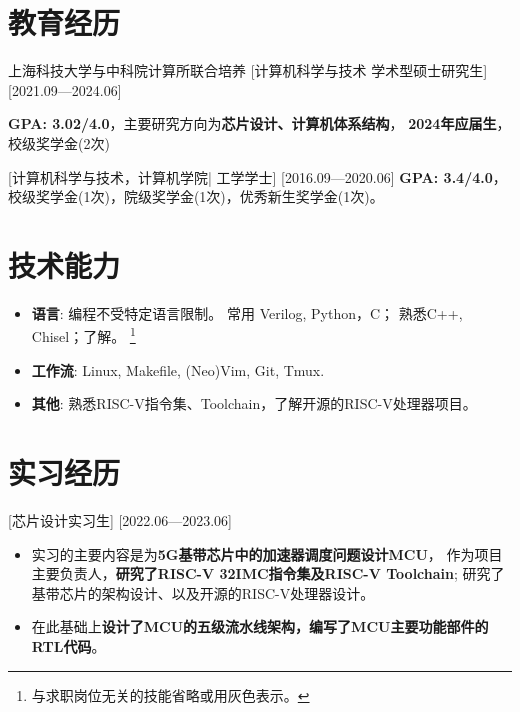 \documentclass{resume}
\begin{document}

\ResumeTitle

\section{教育经历}
\ResumeItem
{上海科技大学与中科院计算所联合培养}
[\textnormal{计算机科学与技术}  学术型硕士研究生]
[2021.09—2024.06]

\textbf{GPA: 3.02/4.0}，主要研究方向为\textbf{芯片设计、计算机体系结构}，
\textbf{2024年应届生}，校级奖学金(2次)

[\textnormal{计算机科学与技术，计算机学院|} 工学学士]
[2016.09—2020.06]
\textbf{GPA: 3.4/4.0}，校级奖学金(1次)，院级奖学金(1次)，优秀新生奖学金(1次)。

\section{技术能力}
\begin{itemize}
  \item \textbf{语言}: 编程不受特定语言限制。
      常用 Verilog, Python，C； 熟悉C++, Chisel；了解。
      \footnote{与求职岗位无关的技能省略或用灰色表示。}
  \item \textbf{工作流}: Linux, Makefile, (Neo)Vim, Git, Tmux.
  \item \textbf{其他}: 熟悉RISC-V指令集、Toolchain，了解开源的RISC-V处理器项目。
\end{itemize}

\section{实习经历}

[芯片设计实习生]
[2022.06—2023.06] 
\begin{itemize}
    \item 实习的主要内容是为\textbf{5G基带芯片中的加速器调度问题设计MCU}，
        作为项目主要负责人，\textbf{研究了RISC-V 32IMC指令集及RISC-V Toolchain};
        研究了基带芯片的架构设计、以及开源的RISC-V处理器设计。
    \item 在此基础上\textbf{设计了MCU的五级流水线架构，编写了MCU主要功能部件的RTL代码}。
\end{itemize}
\end{document}
